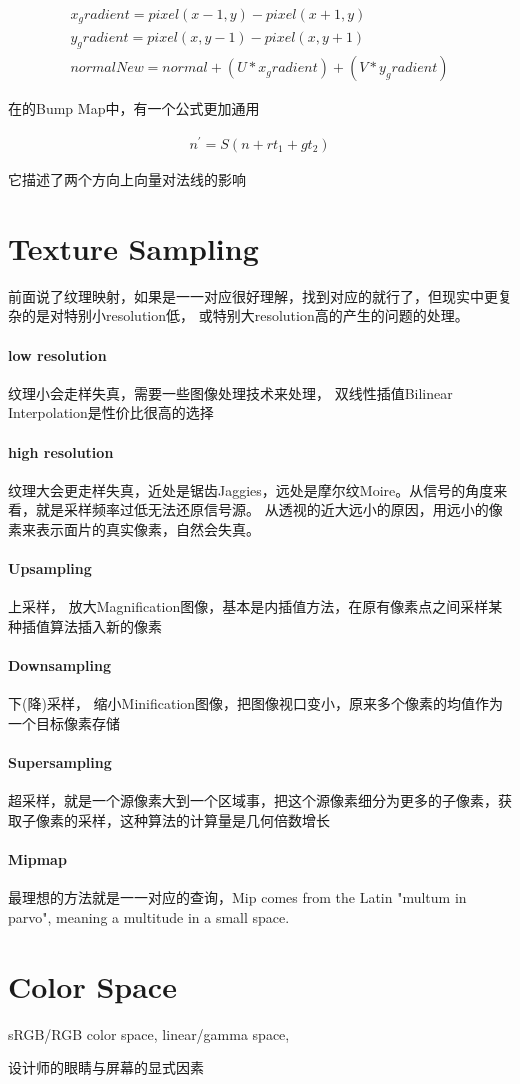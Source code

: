 \begin{gather*}
    x_gradient = pixel(x-1,y) - pixel(x+1,y) \\
    y_gradient = pixel(x,y-1) - pixel(x,y+1) \\
    normalNew = normal + (U * x_gradient) + (V * y_gradient)
\end{gather*}

在的Bump Map\cite{CGPP3ed}中，有一个公式更加通用

\begin{align*}
    n^{'} = S(n + rt_{1} + gt_{2})
\end{align*}

它描述了两个方向上向量对法线的影响

\section{Texture Sampling}

前面说了纹理映射，如果是一一对应很好理解，找到对应的就行了，但现实中更复杂的是对特别小resolution低，
或特别大resolution高的产生的问题的处理。


\paragraph{low resolution}
纹理小会走样失真，需要一些图像处理技术来处理，
双线性插值Bilinear Interpolation是性价比很高的选择

\paragraph{high resolution}
纹理大会更走样失真，近处是锯齿Jaggies，远处是摩尔纹Moire。从信号的角度来看，就是采样频率过低无法还原信号源。
从透视的近大远小的原因，用远小的像素来表示面片的真实像素，自然会失真。

\paragraph{Upsampling}
上采样，
放大Magnification图像，基本是内插值方法，在原有像素点之间采样某种插值算法插入新的像素

\paragraph{Downsampling}
下(降)采样，
缩小Minification图像，把图像视口变小，原来多个像素的均值作为一个目标像素存储

\paragraph{Supersampling}
超采样，就是一个源像素大到一个区域事，把这个源像素细分为更多的子像素，获取子像素的采样，这种算法的计算量是几何倍数增长

\paragraph{Mipmap}
最理想的方法就是一一对应的查询，Mip comes from the Latin "multum in parvo", meaning a multitude in a small space.


\section{Color Space}
sRGB/RGB color space, linear/gamma space, 

设计师的眼睛与屏幕的显式因素

